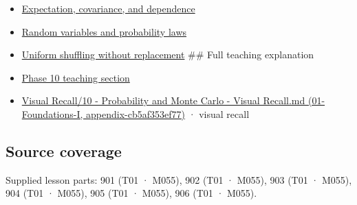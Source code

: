 \begin{itemize}
\item
  \hyperref[appendix-54c383df9992]{Expectation, covariance, and dependence}
\item
  \hyperref[appendix-4d0203f7944f]{Random variables and probability laws}
\item
  \hyperref[appendix-184fcc411663]{Uniform shuffling without replacement} \#\# Full teaching explanation
\item
  \href{Continuous\%20Notes/Computing\%20Foundations\%20-\%20From\%20Bits\%20to\%20C++\%20and\%20Systems\%20APIs\#1.\%20A\%20probability\%20model\%20begins\%20with\%20possible\%20outcomes}{Phase 10 teaching section}
\item
  \href{}{Visual Recall/10 - Probability and Monte Carlo - Visual Recall.md (01-Foundations-I, appendix-cb5af353ef77)} · visual recall
\end{itemize}

\subsection{Source coverage}\label{source-coverage}

Supplied lesson parts: 901 (T01 · M055), 902 (T01 · M055), 903 (T01 · M055), 904 (T01 · M055), 905 (T01 · M055), 906 (T01 · M055).
